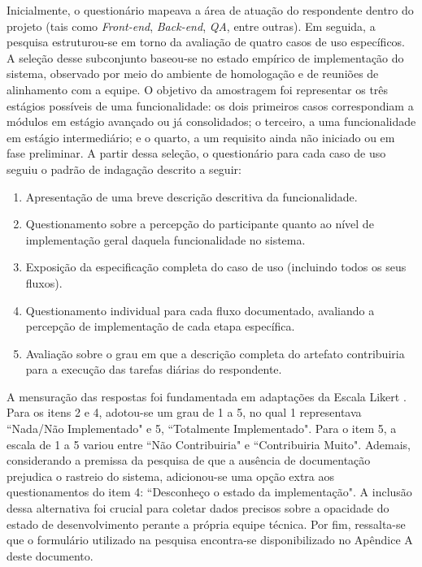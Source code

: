 Inicialmente, o questionário mapeava a área de atuação do respondente dentro do projeto (tais como \textit{Front-end}, \textit{Back-end}, \textit{QA}, entre outras). Em seguida, a pesquisa estruturou-se em torno da avaliação de quatro casos de uso específicos. A seleção desse subconjunto baseou-se no estado empírico de implementação do sistema, observado por meio do ambiente de homologação e de reuniões de alinhamento com a equipe. O objetivo da amostragem foi representar os três estágios possíveis de uma funcionalidade: os dois primeiros casos correspondiam a módulos em estágio avançado ou já consolidados; o terceiro, a uma funcionalidade em estágio intermediário; e o quarto, a um requisito ainda não iniciado ou em fase preliminar. A partir dessa seleção, o questionário para cada caso de uso seguiu o padrão de indagação descrito a seguir:

\begin{enumerate}[topsep=0em, itemsep=0.3em]
    \item Apresentação de uma breve descrição descritiva da funcionalidade.
    \item Questionamento sobre a percepção do participante quanto ao nível de implementação geral daquela funcionalidade no sistema.
    \item Exposição da especificação completa do caso de uso (incluindo todos os seus fluxos).
    \item Questionamento individual para cada fluxo documentado, avaliando a percepção de implementação de cada etapa específica.
    \item Avaliação sobre o grau em que a descrição completa do artefato contribuiria para a execução das tarefas diárias do respondente.
\end{enumerate}

A mensuração das respostas foi fundamentada em adaptações da Escala Likert \cite{25}. Para os itens 2 e 4, adotou-se um grau de 1 a 5, no qual 1 representava ``Nada/Não Implementado" e 5, ``Totalmente Implementado". Para o item 5, a escala de 1 a 5 variou entre ``Não Contribuiria" e ``Contribuiria Muito". Ademais, considerando a premissa da pesquisa de que a ausência de documentação prejudica o rastreio do sistema, adicionou-se uma opção extra aos questionamentos do item 4: ``Desconheço o estado da implementação". A inclusão dessa alternativa foi crucial para coletar dados precisos sobre a opacidade do estado de desenvolvimento perante a própria equipe técnica. Por fim, ressalta-se que o formulário utilizado na pesquisa encontra-se disponibilizado no Apêndice A deste documento.